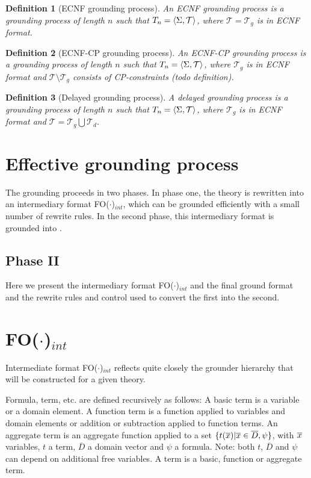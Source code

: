 \documentclass{article}
\newcommand{\seq}[1]{\left\langle#1\right\rangle}
\newcommand{\T}{\mathcal{T}}
\newcommand{\Tg}{\mathcal{T}_g}
\newcommand{\Td}{\mathcal{T}_d}
\newcommand{\pg}{\seq{\voc,\T}}
\newcommand{\indot}{{\sc FO($\cdot$)$_{int}$}\xspace}
\newcommand{\DDD}{\ensuremath{\overline{D}}}
\newtheorem{definition}{Definition}
\begin{document}
\begin{definition}[ECNF grounding process]
	An ECNF grounding process is a grounding process of length $n$ such that $T_n=\pg$, where $\T = \Tg$ is in ECNF format.
\end{definition}


\begin{definition}[ECNF-CP grounding process]
	An ECNF-CP grounding process is a grounding process of length $n$ such that $T_n=\pg$, where $\Tg$ is in ECNF format and $\T\setminus \Tg$ consists of CP-constraints (todo definition).
\end{definition}

\begin{definition}[Delayed grounding process]
	A delayed grounding process is a grounding process of length $n$ such that $T_n=\pg$, where $\Tg$ is in ECNF format and $\T = \Tg \bigcup \Td$.
\end{definition}


\section{Effective grounding process}
The grounding proceeds in two phases.
In phase one, the \fodot theory is rewritten into an intermediary format \indot, which can be grounded efficiently with a small number of rewrite rules. 
In the second phase, this intermediary format is grounded into \pcdot.

\subsection{Phase II}
Here we present the intermediary format \indot and the final ground format \pcdot and the rewrite rules and control used to convert the first into the second.

\section{\indot}
Intermediate format \indot reflects quite closely the grounder hierarchy that will be constructed for a given theory.

Formula, term, etc. are defined recursively as follows:
A basic term is a variable or a domain element.
A function term is a function applied to variables and domain elements or addition or subtraction applied to function terms.
An aggregate term is an aggregate function applied to a set $\{t(\xxx) | \xxx \in \DDD, \psi\}$, with $\overline{x}$ variables, $t$ a term, $\DDD$ a domain vector and $\psi$ a formula. 
Note: both $t$, $\DDD$ and $\psi$ can depend on additional free variables.
A term is a basic, function or aggregate term.
\end{document}
